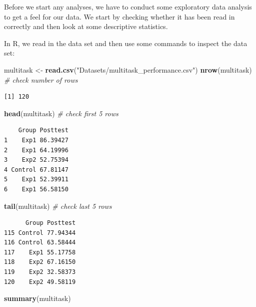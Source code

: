 \documentclass[
  letterpaper,
]{book}
\newenvironment{Shaded}{\begin{snugshade}}{\end{snugshade}}
\newcommand{\CommentTok}[1]{\textcolor[rgb]{0.56,0.35,0.01}{\textit{#1}}}
\newcommand{\FunctionTok}[1]{\textcolor[rgb]{0.13,0.29,0.53}{\textbf{#1}}}
\newcommand{\NormalTok}[1]{#1}
\newcommand{\OtherTok}[1]{\textcolor[rgb]{0.56,0.35,0.01}{#1}}
\newcommand{\StringTok}[1]{\textcolor[rgb]{0.31,0.60,0.02}{#1}}
\begin{document}
Before we start any analyses, we have to conduct some exploratory data
analysis to get a feel for our data. We start by checking whether it has
been read in correctly and then look at some descriptive statistics.

In R, we read in the data set and then use some commands to inspect the
data set:

\begin{Shaded}
\begin{Highlighting}[]
\NormalTok{multitask }\OtherTok{\textless{}{-}} \FunctionTok{read.csv}\NormalTok{(}\StringTok{"Datasets/multitask\_performance.csv"}\NormalTok{)}
\FunctionTok{nrow}\NormalTok{(multitask) }\CommentTok{\# check number of rows}
\end{Highlighting}
\end{Shaded}

\begin{verbatim}
[1] 120
\end{verbatim}

\begin{Shaded}
\begin{Highlighting}[]
\FunctionTok{head}\NormalTok{(multitask) }\CommentTok{\# check first 5 rows }
\end{Highlighting}
\end{Shaded}

\begin{verbatim}
    Group Posttest
1    Exp1 86.39427
2    Exp1 64.19996
3    Exp2 52.75394
4 Control 67.81147
5    Exp1 52.39911
6    Exp1 56.58150
\end{verbatim}

\begin{Shaded}
\begin{Highlighting}[]
\FunctionTok{tail}\NormalTok{(multitask) }\CommentTok{\# check last 5 rows }
\end{Highlighting}
\end{Shaded}

\begin{verbatim}
      Group Posttest
115 Control 77.94344
116 Control 63.58444
117    Exp1 55.17758
118    Exp2 67.16150
119    Exp2 32.58373
120    Exp2 49.58119
\end{verbatim}

\begin{Shaded}
\begin{Highlighting}[]
\FunctionTok{summary}\NormalTok{(multitask)}
\end{Highlighting}
\end{Shaded}
\end{document}
